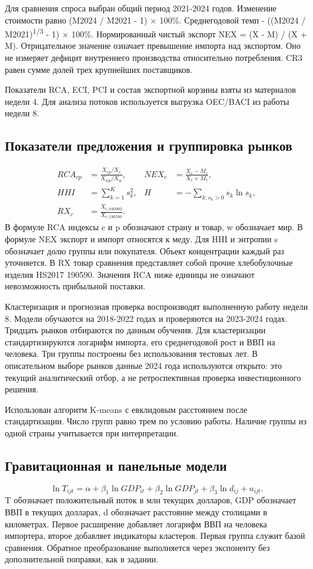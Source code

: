 \documentclass[12pt,a4paper]{article}
\begin{document}
Для сравнения спроса выбран общий период 2021-2024 годов. Изменение стоимости равно (M2024 / M2021 - 1) × 100\%. Среднегодовой темп - ((M2024 / M2021)\textsuperscript{1/3} - 1) × 100\%. Нормированный чистый экспорт NEX = (X - M) / (X + M). Отрицательное значение означает превышение импорта над экспортом. Оно не измеряет дефицит внутреннего производства относительно потребления. CR3 равен сумме долей трех крупнейших поставщиков.

Показатели RCA, ECI, PCI и состав экспортной корзины взяты из материалов недели 4. Для анализа потоков используется выгрузка OEC/BACI из работы недели 8.

\subsection{Показатели предложения и группировка рынков}
\begin{align}
RCA_{cp}&=\frac{X_{cp}/X_c}{X_{wp}/X_w}, &
NEX_c&=\frac{X_c-M_c}{X_c+M_c},\\
HHI&=\sum_{k=1}^{K}s_k^2, &
H&=-\sum_{k:s_k>0}s_k\ln s_k,\\
RX_c&=\frac{X_{c,040900}}{X_{c,190590}}.
\end{align}
В формуле RCA индексы c и p обозначают страну и товар, w обозначает мир. В формуле NEX экспорт и импорт относятся к меду. Для HHI и энтропии s обозначает долю группы или покупателя. Объект концентрации каждый раз уточняется. В RX товар сравнения представляет собой прочие хлебобулочные изделия HS2017 190590. Значения RCA ниже единицы не означают невозможность прибыльной поставки.

Кластеризация и прогнозная проверка воспроизводят выполненную работу недели 8. Модели обучаются на 2018-2022 годах и проверяются на 2023-2024 годах. Тридцать рынков отбираются по данным обучения. Для кластеризации стандартизируются логарифм импорта, его среднегодовой рост и ВВП на человека. Три группы построены без использования тестовых лет. В описательном выборе рынков данные 2024 года используются открыто: это текущий аналитический отбор, а не ретроспективная проверка инвестиционного решения.

Использован алгоритм K-means с евклидовым расстоянием после стандартизации. Число групп равно трем по условию работы. Наличие группы из одной страны учитывается при интерпретации. 

\subsection{Гравитационная и панельные модели}
\begin{equation}
\ln T_{ijt}=\alpha+\beta_1\ln GDP_{it}+\beta_2\ln GDP_{jt}
+\beta_3\ln d_{ij}+u_{ijt}.
\label{eq:gravity}
\end{equation}
T обозначает положительный поток в млн текущих долларов, GDP обозначает ВВП в текущих долларах, d обозначает расстояние между столицами в километрах. Первое расширение добавляет логарифм ВВП на человека импортера, второе добавляет индикаторы кластеров. Первая группа служит базой сравнения. Обратное преобразование выполняется через экспоненту без дополнительной поправки, как в задании.
\end{document}
